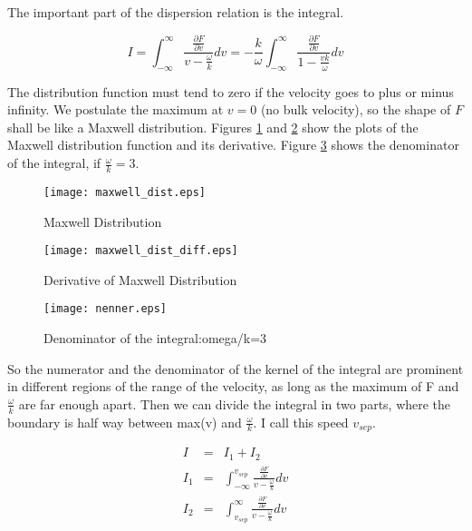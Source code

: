 \documentclass[a4paper,10pt]{report}
\begin{document}
The important part of the dispersion relation is the integral.

\begin{equation}\label{integral}
    I=\int^{\infty}_{-\infty }{  \frac{\frac{\partial F}{\partial v}}{v-\frac{\omega}{k}} dv}=- \frac{k}{\omega} \int^{\infty}_{-\infty }{  \frac{\frac{\partial F}{\partial v}}{1-\frac{vk}{\omega}} dv}
\end{equation}

The distribution function must tend to zero if the velocity goes to plus or minus infinity. We postulate the maximum at $v=0$ (no bulk velocity), so the shape of $F$ shall be like a Maxwell distribution. Figures \ref{fig_maxwell} and \ref{fig_maxwell_diff} show the plots of the Maxwell distribution function and its derivative. Figure \ref{fig_denominator} shows the denominator of the integral, if $\frac{\omega}{k}=3$.


\begin{figure}
  \texttt{[image: maxwell\_dist.eps]}\\
  \caption{Maxwell Distribution}\label{fig_maxwell}
\end{figure}

\begin{figure}
  \texttt{[image: maxwell\_dist\_diff.eps]}\\
  \caption{Derivative of Maxwell Distribution}\label{fig_maxwell_diff}
\end{figure}

\begin{figure}
  \texttt{[image: nenner.eps]}\\
  \caption{Denominator of the integral:omega/k=3}\label{fig_denominator}
\end{figure}

So the numerator and the denominator of the kernel of the integral are prominent in different regions of the range of the velocity, as long as the maximum of F and $\frac{\omega}{k}$ are far enough apart. Then we can divide the integral in two parts, where the boundary is half way between max(v) and $\frac{\omega}{k}$. I call this speed $v_{sep}$.

\begin{eqnarray}
  I &=& I_1 +I_2 \label{sep_int} \\
I_1 &=& \int^{v_{sep}}_{-\infty }{  \frac{\frac{\partial F}{\partial v}}{v-\frac{\omega}{k}} dv} \\
I_2 &=& \int^{\infty}_{v_{sep} }{  \frac{\frac{\partial F}{\partial v}}{v-\frac{\omega}{k}} dv}\end{eqnarray}
\end{document}
